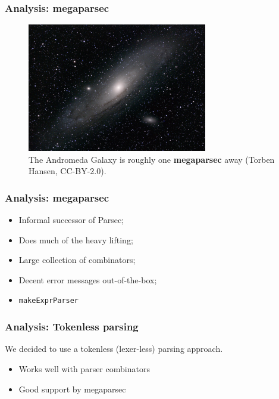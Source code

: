 \documentclass{beamer}
\begin{document}
\begin{frame}
  \frametitle{Analysis: megaparsec}

  \begin{figure}
    \begin{center}
      \includegraphics[width=0.7\textwidth]{figures/andromeda.jpg}
      \captionsetup{labelformat=empty}
      \caption{The Andromeda Galaxy is roughly one \textbf{megaparsec} away (Torben Hansen, CC-BY-2.0).}
    \end{center}
  \end{figure}
\end{frame}

\begin{frame}
  \frametitle{Analysis: megaparsec}

  \begin{itemize}[<+->]
    \item Informal successor of Parsec;
    \item Does much of the heavy lifting;
    \item Large collection of combinators;
    \item Decent error messages out-of-the-box;
    \item \texttt{makeExprParser} 
  \end{itemize}
\end{frame}

\begin{frame}
  \frametitle{Analysis: Tokenless parsing}

  We decided to use a tokenless (lexer-less) parsing approach.

  \begin{itemize}[<+->]
    \item Works well with parser combinators
    \item Good support by megaparsec
  \end{itemize}
\end{frame}
\end{document}
